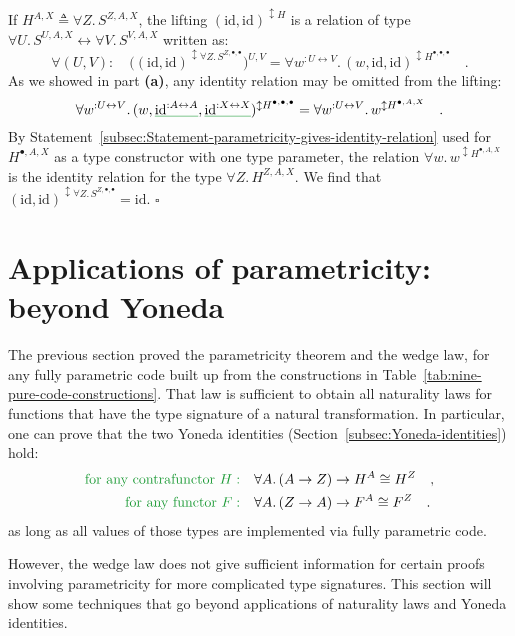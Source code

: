 If $H^{A,X}\triangleq\forall Z.\,S^{Z,A,X}$, the lifting $(\text{id},\text{id})^{\updownarrow H}$
is a relation of type $\forall U.\,S^{U,A,X}\leftrightarrow\forall V.\,S^{V,A,X}$
written as:
\[
\forall(U,V):\quad\big((\text{id},\text{id})^{\updownarrow\forall Z.\,S^{Z,\bullet,\bullet}}\big)^{U,V}=\forall w^{:U\leftrightarrow V}.\,(w,\text{id},\text{id})^{\updownarrow H^{\bullet,\bullet,\bullet}}\quad.
\]
As we showed in part \textbf{(a)}, any identity relation may be omitted
from the lifting:
\[
\forall w^{:U\leftrightarrow V}.\,(w,\gunderline{\text{id}^{:A\leftrightarrow A}},\gunderline{\text{id}^{:X\leftrightarrow X}})^{\updownarrow H^{\bullet,\bullet,\bullet}}=\forall w^{:U\leftrightarrow V}.\,w^{\updownarrow H^{\bullet,A,X}}\quad.
\]
By Statement~\ref{subsec:Statement-parametricity-gives-identity-relation}
used for $H^{\bullet,A,X}$ as a type constructor with one type parameter,
the relation $\forall w.\,w^{\updownarrow H^{\bullet,A,X}}$ is the
identity relation for the type $\forall Z.\,H^{Z,A,X}$. We find that
$(\text{id},\text{id})^{\updownarrow\forall Z.\,S^{Z,\bullet,\bullet}}=\text{id}$.
$\square$

\begin{comment}
commutativity law does not hold!
\end{comment}


\section{Applications of parametricity: beyond Yoneda\label{sec:Applications-of-parametricity:beyond-Yoneda}}

The previous section proved the parametricity theorem and the wedge
law, for any fully parametric code built up from the constructions
in Table~\ref{tab:nine-pure-code-constructions}. That law is sufficient
to obtain all naturality laws for functions that have the type signature
of a natural transformation. In particular, one can prove that the
two Yoneda identities (Section~\ref{subsec:Yoneda-identities}) hold:
\begin{align*}
{\color{greenunder}\text{for any contrafunctor }H:}\quad & \forall A.\,(A\rightarrow Z)\rightarrow H^{A}\cong H^{Z}\quad,\\
{\color{greenunder}\text{for any functor }F:}\quad & \forall A.\,(Z\rightarrow A)\rightarrow F^{A}\cong F^{Z}\quad.
\end{align*}
 as long as all values of those types are implemented via fully parametric
code.

However, the wedge law does not give sufficient information for certain
proofs involving parametricity for more complicated type signatures.
This section will show some techniques that go beyond applications
of naturality laws and Yoneda identities.

